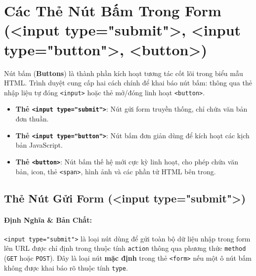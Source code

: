 \documentclass[11pt,oneside]{book}
\newcommand{\codeinline}[1]{\textcolor{accentOrange}{\texttt{#1}}}
\newcommand{\term}[1]{\textbf{\textcolor{primaryBlue}{#1}}}
\begin{document}
\section[Các Thẻ Nút Bấm Trong Form]{Các Thẻ Nút Bấm Trong Form (<input type="submit">, <input type="button">, <button>)}
\label{sec:html_form_buttons}

\begin{conceptBox}
Nút bấm (\term{Buttons}) là thành phần kích hoạt tương tác cốt lõi trong biểu mẫu HTML. Trình duyệt cung cấp hai cách chính để khai báo nút bấm: thông qua thẻ nhập liệu tự đóng \codeinline{<input>} hoặc thẻ mở/đóng linh hoạt \codeinline{<button>}.
\begin{itemize}[leftmargin=1.5em, itemsep=2pt, parsep=0pt]
    \item \textbf{Thẻ \codeinline{<input type="submit">}}: Nút gửi form truyền thống, chỉ chứa văn bản đơn thuần.
    \item \textbf{Thẻ \codeinline{<input type="button">}}: Nút bấm đơn giản dùng để kích hoạt các kịch bản JavaScript.
    \item \textbf{Thẻ \codeinline{<button>}}: Nút bấm thế hệ mới cực kỳ linh hoạt, cho phép chứa văn bản, icon, thẻ \codeinline{<span>}, hình ảnh và các phần tử HTML bên trong.
\end{itemize}
\end{conceptBox}

\subsection{Thẻ Nút Gửi Form (<input type="submit">)}
\label{subsec:input_submit}

\paragraph{Định Nghĩa \& Bản Chất:}
\codeinline{<input type="submit">} là loại nút dùng để gửi toàn bộ dữ liệu nhập trong form lên URL được chỉ định trong thuộc tính \codeinline{action} thông qua phương thức \codeinline{method} (\codeinline{GET} hoặc \codeinline{POST}). Đây là loại nút \textbf{mặc định} trong thẻ \codeinline{<form>} nếu một ô nút bấm không được khai báo rõ thuộc tính \codeinline{type}.
\end{document}

